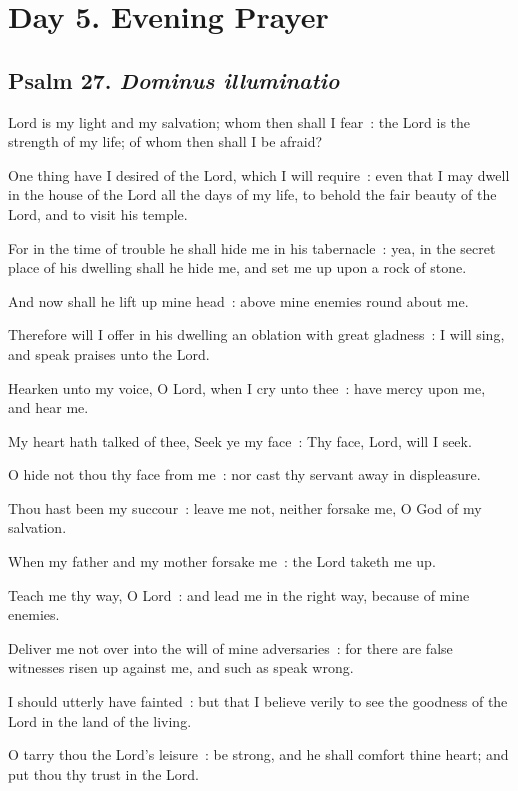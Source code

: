 \section*{Day 5. Evening Prayer}

\subsection{Psalm 27. \textit{Dominus illuminatio}}


 Lord is my light and my salvation; whom then shall I fear~: the Lord is the strength of my life; of whom then shall I be afraid?\par
{}
One thing have I desired of the Lord, which I will require~: even that I may dwell in the house of the Lord all the days of my life, to behold the fair beauty of the Lord, and to visit his temple.\par
{}For in the time of trouble he shall hide me in his tabernacle~: yea, in the secret place of his dwelling shall he hide me, and set me up upon a rock of stone.\par
{}And now shall he lift up mine head~: above mine enemies round about me.\par
{}Therefore will I offer in his dwelling an oblation with great gladness~: I will sing, and speak praises unto the Lord.\par
{}Hearken unto my voice, O Lord, when I cry unto thee~: have mercy upon me, and hear me.\par
{}My heart hath talked of thee, Seek ye my face~: Thy face, Lord, will I seek.\par
{}O hide not thou thy face from me~: nor cast thy servant away in displeasure.\par
{}Thou hast been my succour~: leave me not, neither forsake me, O God of my salvation.\par
{}When my father and my mother forsake me~: the Lord taketh me up.\par
{}Teach me thy way, O Lord~: and lead me in the right way, because of mine enemies.\par
{}Deliver me not over into the will of mine adversaries~: for there are false witnesses risen up against me, and such as speak wrong.\par
{}I should utterly have fainted~: but that I believe verily to see the goodness of the Lord in the land of the living.\par
{}O tarry thou the Lord's leisure~: be strong, and he shall comfort thine heart; and put thou thy trust in the Lord.\par

